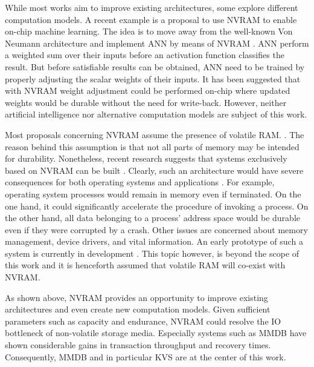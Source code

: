 While most works aim to improve existing architectures, some explore different
computation models. A recent example is a proposal to use \ac{NVRAM} to enable
on-chip machine learning. The idea is to move away from the well-known Von
Neumann architecture and implement \ac{ANN} by means of \ac{NVRAM}
\cite{fumarola2016accelerating}. \ac{ANN} perform a weighted sum over their
inputs before an activation function classifies the result. But before
satisfiable results can be obtained, \ac{ANN} need to be trained by properly
adjusting the scalar weights of their inputs. It has been suggested that with
\ac{NVRAM} weight adjustment could be performed on-chip where updated weights
would be durable without the need for write-back. However, neither artificial
intelligence nor alternative computation models are subject of this work.

Most proposals concerning \ac{NVRAM} assume the presence of volatile \ac{RAM}.
\cite{oukid2017data}. The reason behind this assumption is that not all parts of
memory may be intended for durability. Nonetheless, recent research suggests
that systems exclusively based on \ac{NVRAM} can be built
\cite{narayanan2012whole, courtland2016can}. Clearly, such an architecture would
have severe consequences for both operating systems and applications
\cite{bailey2011operating}. For example, operating system processes would remain
in memory even if terminated. On the one hand, it could significantly accelerate
the procedure of invoking a process. On the other hand, all data belonging to a
process' address space would be durable even if they were corrupted by a crash.
Other issues are concerned about memory management, device drivers, and vital
information. An early prototype of such a system is currently in development
\cite{courtland2016can}. This topic however, is beyond the scope of this work
and it is henceforth assumed that volatile \ac{RAM} will co-exist with
\ac{NVRAM}.

As shown above, \ac{NVRAM} provides an opportunity to improve existing
architectures and even create new computation models. Given sufficient
parameters such as capacity and endurance, \ac{NVRAM} could resolve the \ac{IO}
bottleneck of non-volatile storage media. Especially systems such as \ac{MMDB}
have shown considerable gains in transaction throughput and recovery times.
Consequently, \ac{MMDB} and in particular \ac{KVS} are at the center of this
work.
